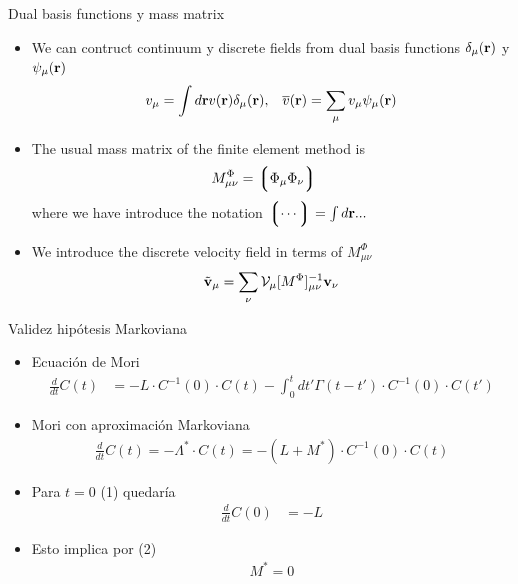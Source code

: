 \documentclass{beamer}
\newcommand{\esc}{\!\cdot\!}
\newcommand{\llg}{\left\lgroup}
\newcommand{\rlg}{\right\rgroup}
\begin{document}
\begin{frame}{Dual basis functions y mass matrix}
  \begin{itemize}
  \item We can contruct continuum y discrete fields from dual basis functions $\delta_{\mu}({\bf r})$ y $\psi_\mu({\bf r})$ 
    \begin{align}
      v_\mu=\int d{\bf r}v({\bf r})\delta_\mu({\bf r}),&&
        \overline{v}({\bf r}) =\sum_{\mu}v_\mu\psi_\mu({\bf r})
    \nonumber
    \end{align}
    \item The usual mass matrix of the finite element method is
      \begin{align}
      M^\Phi_{\mu\nu}&=\llg\Phi_\mu\Phi_\nu\rlg  
      \nonumber
      \end{align}
      where we have introduce the notation $\llg\cdots\rlg=\int d{\bf r}...$
    \item We introduce the discrete velocity field in terms of $M^\Phi_{\mu\nu}$
      \begin{align}
        \tilde{{\bf v}}_{\mu}=\sum_{\nu}{\cal V}_{\mu}[M^{\Phi}]^{-1}_{\mu\nu}{\bf v}_{\nu}
        \nonumber
      \end{align}
  \end{itemize}
\end{frame}

\begin{frame}{Validez hipótesis Markoviana}
  \begin{itemize}
    \item Ecuación de Mori
\begin{align}
  \frac{d}{dt}C(t)&=-L\esc C^{-1}(0)\esc C(t)
  -\int_0^tdt' \Gamma(t-t')\esc C^{-1}(0)\esc  C(t')
\end{align}
\item Mori con aproximación Markoviana
  \begin{align}
    \frac{d}{dt}C(t)=-\Lambda^*\esc C(t)=-(L+M^*)\esc C^{-1}(0)\esc C(t)
  \end{align}

\item Para $t=0$ (1) quedaría
  \begin{align}
  \frac{d}{dt}C(0)&=-L
    \nonumber
\end{align}

\item Esto implica por (2) 
  \begin{align}
  M^*=0
  \end{align}
\end{itemize}
\end{frame}
\end{document}
